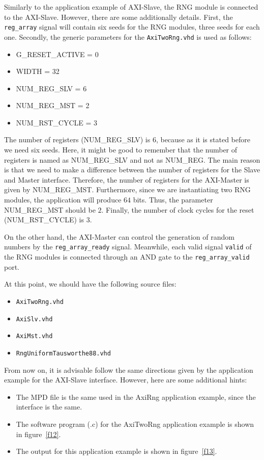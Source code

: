 Similarly to the application example of AXI-Slave, the RNG module is connected to the AXI-Slave. However, there are some additionally details. First, the {\tt reg\_array} signal will contain six seeds for the RNG modules, three seeds for each one. Secondly, the generic parameters for the {\tt AxiTwoRng.vhd} is used as follows:

\begin{itemize}
\item G\_RESET\_ACTIVE = 0
\item WIDTH = 32
\item NUM\_REG\_SLV = 6
\item NUM\_REG\_MST = 2
\item NUM\_RST\_CYCLE = 3
\end{itemize}

The number of registers (NUM\_REG\_SLV) is $6$, because as it is stated before we need six seeds. Here, it might be good to remember that the number of registers is named as NUM\_REG\_SLV and not as NUM\_REG. The main reason is that we need to make a difference between the number of registers for the Slave and Master interface. Therefore, the number of registers for the AXI-Master is given by NUM\_REG\_MST. Furthermore, since we are instantiating two RNG modules, the application will produce $64$ bits. Thus, the parameter NUM\_REG\_MST should be $2$. Finally, the number of clock cycles for the reset (NUM\_RST\_CYCLE) is $3$.

On the other hand, the AXI-Master can control the generation of random numbers by the {\tt reg\_array\_ready} signal. Meanwhile, each valid signal {\tt valid} of the RNG modules is connected through an AND gate to the {\tt reg\_array\_valid} port.

At this point, we should have the following source files:

\begin{itemize}
\item {\tt AxiTwoRng.vhd}
\item {\tt AxiSlv.vhd}
\item {\tt AxiMst.vhd} 
\item {\tt RngUniformTausworthe88.vhd}
\end{itemize}

From now on, it is advisable follow the same directions given by the application example for the AXI-Slave interface. However, here are some additional hints:

\begin{itemize}
\item The MPD file is the same used in the AxiRng application example, since the interface is the same.
\item The software program (.c) for the AxiTwoRng application example is shown in figure~\ref{f12}.
\item The output for this application example is shown in figure~\ref{f13}.
\end{itemize}

